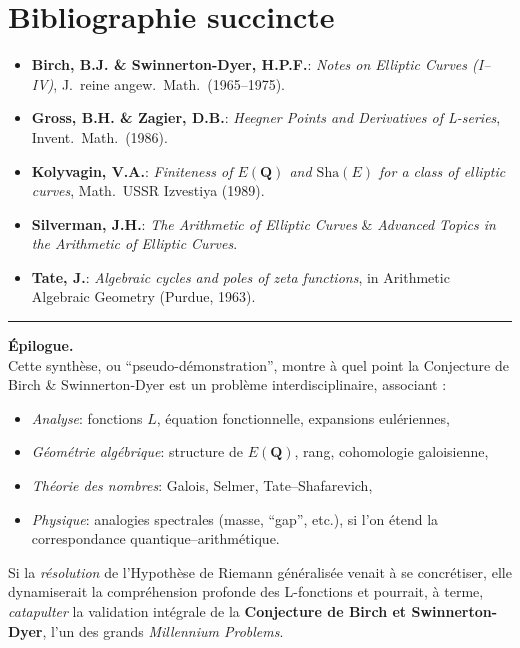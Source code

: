 \documentclass[11pt]{article}
\newcommand{\Sh}{\mathrm{Sha}}
\begin{document}
\section*{Bibliographie succincte}
\begin{itemize}
  \item \textbf{Birch, B.J. \& Swinnerton-Dyer, H.P.F.}: \emph{Notes on Elliptic Curves (I--IV)}, J.\ reine angew.\ Math.\ (1965--1975).
  \item \textbf{Gross, B.H. \& Zagier, D.B.}: \emph{Heegner Points and Derivatives of L-series}, Invent.\ Math.\ (1986).
  \item \textbf{Kolyvagin, V.A.}: \emph{Finiteness of $E(\mathbf{Q})$ and $\Sh(E)$ for a class of elliptic curves}, Math.\ USSR Izvestiya (1989).
  \item \textbf{Silverman, J.H.}: \emph{The Arithmetic of Elliptic Curves} \& \emph{Advanced Topics in the Arithmetic of Elliptic Curves}.
  \item \textbf{Tate, J.}: \emph{Algebraic cycles and poles of zeta functions}, in Arithmetic Algebraic Geometry (Purdue, 1963).
\end{itemize}

\hrule
\vspace{6pt}

\noindent
\textbf{Épilogue.}\\
Cette synthèse, ou ``pseudo-démonstration'', montre à quel point la Conjecture de Birch \& Swinnerton-Dyer est un problème interdisciplinaire, associant :
\begin{itemize}
  \item \emph{Analyse}: fonctions $L$, équation fonctionnelle, expansions eulériennes,
  \item \emph{Géométrie algébrique}: structure de $E(\mathbf{Q})$, rang, cohomologie galoisienne,
  \item \emph{Théorie des nombres}: Galois, Selmer, Tate--Shafarevich,
  \item \emph{Physique}: analogies spectrales (masse, “gap”, etc.), si l'on étend la correspondance quantique--arithmétique.
\end{itemize}
Si la \emph{résolution} de l'Hypothèse de Riemann généralisée venait à se concrétiser, elle dynamiserait la compréhension profonde des L-fonctions et pourrait, à terme, \emph{catapulter} la validation intégrale de la \textbf{Conjecture de Birch et Swinnerton-Dyer}, l'un des grands \emph{Millennium Problems}.
\end{document}
